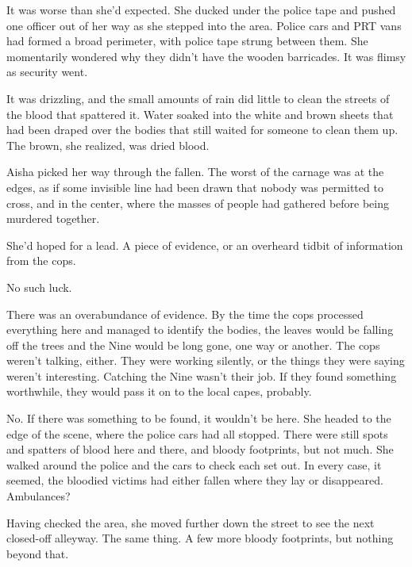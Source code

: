 \blacksquare



It was worse than she'd expected.  She ducked under the police tape and pushed one officer out of her way as she stepped into the area.  Police cars and PRT vans had formed a broad perimeter, with police tape strung between them.  She momentarily wondered why they didn't have the wooden barricades.  It was flimsy as security went.



It was drizzling, and the small amounts of rain did little to clean the streets of the blood that spattered it.  Water soaked into the white and brown sheets that had been draped over the bodies that still waited for someone to clean them up.  The brown, she realized, was dried blood.



Aisha picked her way through the fallen.  The worst of the carnage was at the edges, as if some invisible line had been drawn that nobody was permitted to cross, and in the center, where the masses of people had gathered before being murdered together.



She'd hoped for a lead.  A piece of evidence, or an overheard tidbit of information from the cops.



No such luck.



There was an overabundance of evidence.  By the time the cops processed everything here and managed to identify the bodies, the leaves would be falling off the trees and the Nine would be long gone, one way or another.  The cops weren't talking, either.  They were working silently, or the things they were saying weren't interesting.  Catching the Nine wasn't their job.  If they found something worthwhile, they would pass it on to the local capes, probably.



No.  If there was something to be found, it wouldn't be here.  She headed to the edge of the scene, where the police cars had all stopped.  There were still spots and spatters of blood here and there, and bloody footprints, but not much.  She walked around the police and the cars to check each set out.  In every case, it seemed, the bloodied victims had either fallen where they lay or disappeared.  Ambulances?



Having checked the area, she moved further down the street to see the next closed-off alleyway.  The same thing.  A few more bloody footprints, but nothing beyond that.



